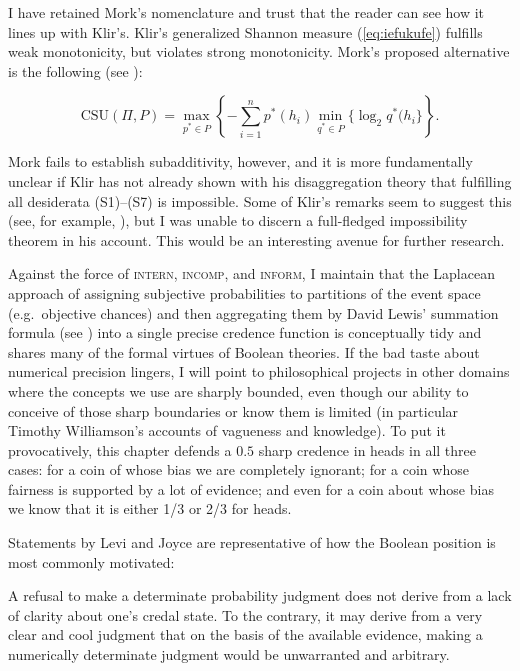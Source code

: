 \documentclass[phd,12pt,oneside]{ubcthesis}
\begin{document}
I have retained Mork's nomenclature and trust that the reader can see
how it lines up with Klir's. Klir's generalized Shannon measure
(\ref{eq:iefukufe}) fulfills weak monotonicity, but violates strong
monotonicity. Mork's proposed alternative is
the following (see ):

\begin{equation}
  \label{eq:aeghapoo}
  \mbox{CSU}(\Pi,P)=\max_{p^{*}\in{}P}\left\{-\sum_{i=1}^{n}p^{*}(h_{i})\min_{q^{*}\in{}P}\{\log_{2}q^{*}(h_{i}\}\right\}.
\end{equation}

Mork fails to establish subadditivity, however, and it is more
fundamentally unclear if Klir has not already shown with his
disaggregation theory that fulfilling all desiderata (S1)--(S7) is
impossible. Some of Klir's remarks seem to suggest this (see, for
example, ), but I was unable to discern a
full-fledged impossibility theorem in his account. This would be an
interesting avenue for further research.

Against the force of \textsc{intern}, \textsc{incomp}, and
\textsc{inform}, I maintain that the Laplacean approach of assigning
subjective probabilities to partitions of the event space (e.g.\
objective chances) and then aggregating them by David Lewis' summation
formula (see \scite{8}{lewis81}{266f}) into a single precise credence
function is conceptually tidy and shares many of the formal virtues of
Boolean theories. If the bad taste about numerical precision lingers,
I will point to philosophical projects in other domains where the
concepts we use are sharply bounded, even though our ability to
conceive of those sharp boundaries or know them is limited (in
particular Timothy Williamson's accounts of vagueness and knowledge).
To put it provocatively, this chapter defends a $0.5$ sharp credence in
heads in all three cases: for a coin of whose bias we are completely
ignorant; for a coin whose fairness is supported by a lot of evidence;
and even for a coin about whose bias we know that it is either 1/3 or
2/3 for heads.

Statements by Levi and Joyce are representative of how the Boolean
position is most commonly motivated:

\begin{quotex}
  A refusal to make a determinate probability judgment does not derive
  from a lack of clarity about one's credal state. To the contrary, it
  may derive from a very clear and cool judgment that on the basis of
  the available evidence, making a numerically determinate judgment
  would be unwarranted and arbitrary. \scite{3}{levi85}{395}
\end{quotex}
\end{document}

